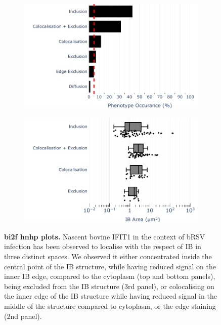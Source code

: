 \begin{figure}
    \begin{subfigure}{0.5\textwidth}
        \caption{}
        \includegraphics[width=1\linewidth]{10. Chapter 5/Figs/03. IFIT2-FLAG/03. IFIT2F/01. pIB/04. bar_bi2f_hnhp.pdf} 
    \end{subfigure}
    \begin{subfigure}{0.5\textwidth}
        \caption{}
        \includegraphics[width=1\linewidth]{10. Chapter 5/Figs/03. IFIT2-FLAG/03. IFIT2F/01. pIB/05. box_bi2f_hnhp.pdf}
    \end{subfigure}
    \caption[bi2f hnhp plots]{\textbf{bi2f hnhp plots.} Nascent bovine IFIT1 in the context of bRSV infection has been observed to localise with the respect of IB in three distinct spaces. We observed it either concentrated inside the central point of the IB structure, while having reduced signal on the inner IB edge, compared to the cytoplasm (top and bottom panels), being excluded from the IB structure (3rd panel), or colocalising on the inner edge of the IB structure while having reduced signal in the middle of the structure compared to cytoplasm, or the edge staining (2nd panel).}
    \label{fig:bi2f hnhp plots}
\end{figure}

